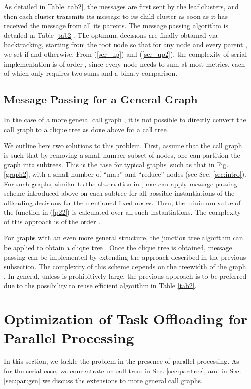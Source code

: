 \documentclass[journal,twocolumn,10pt,twoside]{IEEEtranTCOM}
\theoremstyle{plain}
\theoremstyle{plain}
\theoremstyle{remark}
\begin{document}
As detailed in Table \ref{tab2}, the messages are first sent by the leaf clusters, and then each cluster transmits its message  to its child cluster as soon as it has received the message from all its parents. The message passing algorithm is detailed in Table \ref{tab2}. The optimum decisions are finally obtained via backtracking, starting from the root node  so that for any node  and every parent , we set  if  and  otherwise. From (\ref{ser_up}) and (\ref{ser_up2}), the complexity of serial implementation is of order , since every node needs to sum at most  metrics, each of which only requires two sums and a binary comparison.

\subsection{Message Passing for a General Graph}
\label{sec:ser:graph}

In the case of a more general call graph , it is not possible to directly convert the call graph to a clique tree as done above for a call tree.

We outline here two solutions to this problem. First, assume that the call graph is such that by removing a small number subset  of nodes, one can partition the graph into subtrees. This is the case for typical graphs, such as that in Fig. \ref{graph2}, with a small number of ``map'' and ``reduce'' nodes (see Sec. \ref{sec:intro}). For such graphs, similar to the observation in \cite{hermp}, one can apply message passing scheme introduced above on each subtree for all possible instantiations of the offloading decisions for the mentioned fixed nodes. Then, the minimum value of the function in (\ref{p22}) is calculated over all such instantiations. The complexity of this approach is of the order  .

For graphs with an even more general structure, the junction tree algorithm can be applied to obtain a clique tree \cite[Ch. 10]{koller}. Once the clique tree is obtained, message passing can be implemented by extending the approach described in the previous subsection. The complexity of this scheme depends on the treewidth of the graph \cite{koller}. In general, unless  is prohibitively large, the previous approach is to be preferred due to the possibility to reuse efficient algorithm in Table \ref{tab2}.



\section{Optimization of Task Offloading for Parallel Processing}
\label{sec:par}
In this section, we tackle the problem  in the presence of parallel processing. As for the serial case, we concentrate on call trees  in Sec. \ref{sec:par:tree}, and in Sec. \ref{sec:par:gen} we discuss the extensions to more general call graphs.
\end{document}
